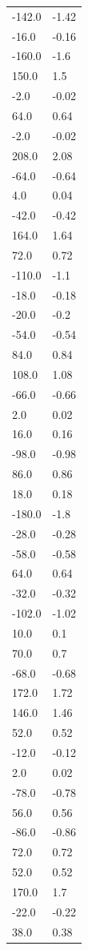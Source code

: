 \begin{longtable}{ll}
-142.0 & -1.42 \\
-16.0 & -0.16 \\
-160.0 & -1.6 \\
150.0 & 1.5 \\
-2.0 & -0.02 \\
64.0 & 0.64 \\
-2.0 & -0.02 \\
208.0 & 2.08 \\
-64.0 & -0.64 \\
4.0 & 0.04 \\
-42.0 & -0.42 \\
164.0 & 1.64 \\
72.0 & 0.72 \\
-110.0 & -1.1 \\
-18.0 & -0.18 \\
-20.0 & -0.2 \\
-54.0 & -0.54 \\
84.0 & 0.84 \\
108.0 & 1.08 \\
-66.0 & -0.66 \\
2.0 & 0.02 \\
16.0 & 0.16 \\
-98.0 & -0.98 \\
86.0 & 0.86 \\
18.0 & 0.18 \\
-180.0 & -1.8 \\
-28.0 & -0.28 \\
-58.0 & -0.58 \\
64.0 & 0.64 \\
-32.0 & -0.32 \\
-102.0 & -1.02 \\
10.0 & 0.1 \\
70.0 & 0.7 \\
-68.0 & -0.68 \\
172.0 & 1.72 \\
146.0 & 1.46 \\
52.0 & 0.52 \\
-12.0 & -0.12 \\
2.0 & 0.02 \\
-78.0 & -0.78 \\
56.0 & 0.56 \\
-86.0 & -0.86 \\
72.0 & 0.72 \\
52.0 & 0.52 \\
170.0 & 1.7 \\
-22.0 & -0.22 \\
38.0 & 0.38 \\

\end{longtable}
